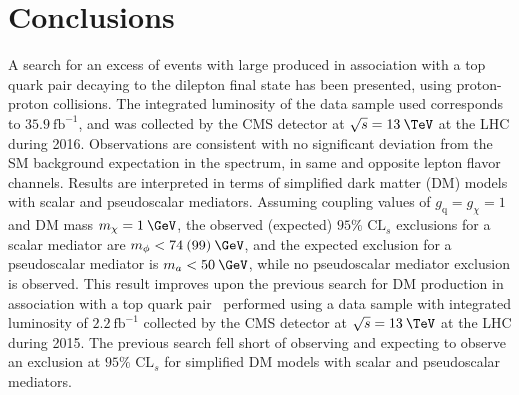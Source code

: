 \chapter{Conclusions}
\label{chap:conclusion}

A search for an excess of events with large \ptmiss produced in association with a top quark pair decaying to the dilepton final state has been presented, using proton-proton collisions. The integrated luminosity of the data sample used corresponds to $35.9\:\textrm{fb}^{-1}$, and was collected by the CMS detector at $\sqrt{s}=13\:\TeV$ at the LHC during 2016. Observations are consistent with no significant deviation from the SM background expectation in the \ptmiss spectrum, in same and opposite lepton flavor channels. Results are interpreted in terms of simplified dark matter (DM) models with scalar and pseudoscalar mediators. Assuming coupling values of $g_{\textrm{q}} = g_{\chi} = 1$ and DM mass $m_{\chi} = 1\:\GeV$, the observed (expected) $95\%$ $\textrm{CL}_{s}$ exclusions for a scalar mediator are $m_{\phi} < 74\:(99)\:\GeV$, and the expected exclusion for a pseudoscalar mediator is $m_{a} < 50\:\GeV$, while no pseudoscalar mediator exclusion is observed. This result improves upon the previous search for DM production in association with a top quark pair~\cite{Sirunyan:2017xgm} performed using a data sample with integrated luminosity of $2.2\:\textrm{fb}^{-1}$ collected by the CMS detector at $\sqrt{s}=13\:\TeV$ at the LHC during 2015. The previous search fell short of observing and expecting to observe an exclusion at $95\%$ $\textrm{CL}_{s}$ for simplified DM models with scalar and pseudoscalar mediators. 
